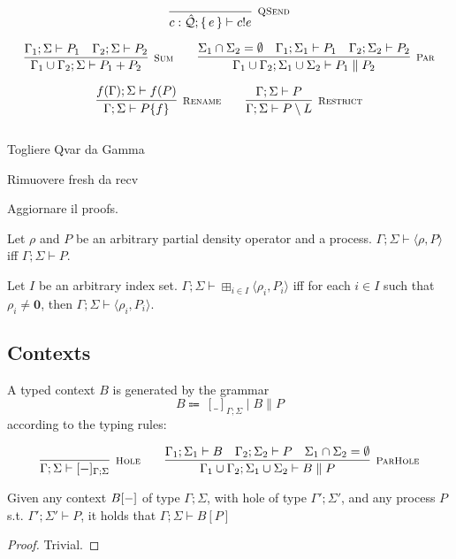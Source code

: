 \begin{gather*}
\infer[\mbox{\footnotesize\scshape QSend}]{c : \hat{\mathcal{Q}}; \set{e} \vdash c!e}{} \\[0.2cm]
\infer[\mbox{\footnotesize\scshape Sum}]{\Gamma_1 \cup \Gamma_2; \Sigma \vdash P_1 + P_2}{\Gamma_1;\Sigma \vdash P_1 & \Gamma_2;\Sigma \vdash P_2} \qquad 
\infer[\mbox{\footnotesize\scshape Par}]{\Gamma_1 \cup \Gamma_2; \Sigma_1 \cup \Sigma_2 \vdash P_1 \parallel P_2}
  {\Sigma_1 \cap \Sigma_2 = \emptyset & \Gamma_1; \Sigma_1 \vdash P_1 & \Gamma_2; \Sigma_2 \vdash P_2} \\[0.2cm]
\infer[\mbox{\footnotesize\scshape Rename}]{\Gamma; \Sigma \vdash P \{f\}}{f(\Gamma); \Sigma \vdash f(P)} \qquad
\infer[\mbox{\footnotesize\scshape Restrict}]{\Gamma; \Sigma \vdash P \setminus L}{\Gamma; \Sigma \vdash P} \\[0.3cm]
\end{gather*}

{\color{red} 
Togliere Qvar da Gamma

Rimuovere fresh da recv

Aggiornare il proofs.
}

\begin{definition}
  Let $\rho$ and $P$ be an arbitrary partial density operator and a process. $\Gamma; \Sigma \vdash \langle \rho, P \rangle$ iff $\Gamma; \Sigma \vdash P$.

  Let $I$ be an arbitrary index set. $\Gamma; \Sigma \vdash \boxplus_{i \in I} \langle \rho_i, P_i \rangle$ iff for each $i \in I$ such that $\rho_i \neq \mathbf{0}$,
  then $\Gamma; \Sigma \vdash \langle \rho_i, P_i \rangle$.
\end{definition}

\subsection*{Contexts}
A typed context $B$ is generated by the grammar
\[
B \Coloneqq \ [\_]_{\Gamma; \Sigma} \mid B \parallel P
\]
according to the typing rules:

\[
  \infer[\mbox{\footnotesize\scshape Hole}]{\Gamma; \Sigma \vdash [\blank]_{\Gamma; \Sigma}}{}
\qquad
\infer[\mbox{\footnotesize\scshape ParHole}]{\Gamma_1 \cup \Gamma_2; \Sigma_1 \cup \Sigma_2 \vdash B \parallel P}
{\Gamma_1; \Sigma_1 \vdash B & \Gamma_2; \Sigma_2 \vdash P & \Sigma_1 \cap \Sigma_2 = \emptyset}
\]


\begin{theorem}
	Given any context $B[{-}]$ of type $\Gamma; \Sigma$, with hole of type $\Gamma'; \Sigma'$, and any process $P$ s.t. $\Gamma'; \Sigma' \vdash P$, it holds that $\Gamma; \Sigma \vdash B[P]$ 
\end{theorem}
\begin{proof}
	Trivial.
\end{proof}